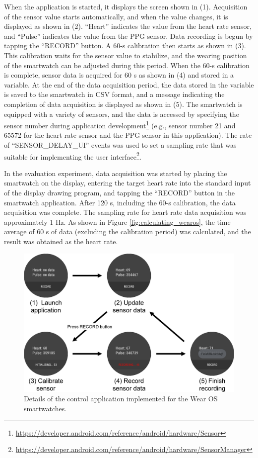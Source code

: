 When the application is started, it displays the screen shown in (1). Acquisition of the sensor value starts automatically, and when the value changes, it is displayed as shown in (2). ``Heart'' indicates the value from the heart rate sensor, and ``Pulse'' indicates the value from the PPG sensor. Data recording is begun by tapping the ``RECORD'' button. A 60-s calibration then starts as shown in (3). This calibration waits for the sensor value to stabilize, and the wearing position of the smartwatch can be adjusted during this period. When the 60-s calibration is complete, sensor data is acquired for 60 s as shown in (4) and stored in a variable. At the end of the data acquisition period, the data stored in the variable is saved to the smartwatch in CSV format, and a message indicating the completion of data acquisition is displayed as shown in (5). The smartwatch is equipped with a variety of sensors, and the data is accessed by specifying the sensor number during application development\footnote{\url{https://developer.android.com/reference/android/hardware/Sensor}} (e.g., sensor number 21 and 65572 for the heart rate sensor and the PPG sensor in this application). The rate of ``SENSOR\_DELAY\_UI'' events was used to set a sampling rate that was suitable for implementing the user interface\footnote{\url{https://developer.android.com/reference/android/hardware/SensorManager}}.\par

In the evaluation experiment, data acquisition was started by placing the smartwatch on the display, entering the target heart rate into the standard input of the display drawing program, and tapping the ``RECORD'' button in the smartwatch application. After 120 s, including the 60-s calibration, the data acquisition was complete. The sampling rate for heart rate data acquisition was approximately 1 Hz. As shown in Figure \ref{fig:calculating_wearos}, the time average of 60 s of data (excluding the calibration period) was calculated, and the result was obtained as the heart rate.

\begin{figure}[!t]
  \centering
  \includegraphics[width=1\linewidth]{figures/app.eps}
  \caption{Details of the control application implemented for the Wear OS smartwatches.}
  \label{fig:app}
\end{figure}

